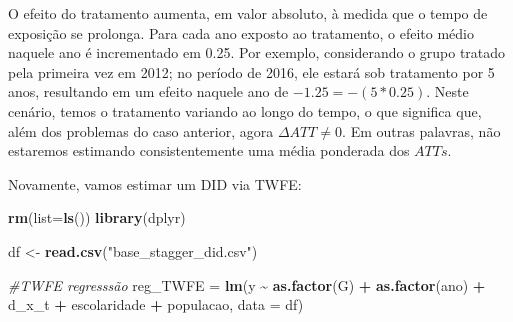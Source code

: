 \documentclass[portugues]{article}
\newenvironment{Shaded}{\begin{snugshade}}{\end{snugshade}}
\newcommand{\AttributeTok}[1]{\textcolor[rgb]{0.13,0.29,0.53}{#1}}
\newcommand{\CommentTok}[1]{\textcolor[rgb]{0.56,0.35,0.01}{\textit{#1}}}
\newcommand{\FunctionTok}[1]{\textcolor[rgb]{0.13,0.29,0.53}{\textbf{#1}}}
\newcommand{\NormalTok}[1]{#1}
\newcommand{\OtherTok}[1]{\textcolor[rgb]{0.56,0.35,0.01}{#1}}
\newcommand{\SpecialCharTok}[1]{\textcolor[rgb]{0.81,0.36,0.00}{\textbf{#1}}}
\newcommand{\StringTok}[1]{\textcolor[rgb]{0.31,0.60,0.02}{#1}}
\begin{document}
\begin{boxA}
\begin{center}
\end{center}

O efeito do tratamento aumenta, em valor absoluto, à medida que o tempo de exposição se prolonga. Para cada ano exposto ao tratamento, o efeito médio naquele ano é incrementado em 0.25. Por exemplo, considerando o grupo tratado pela primeira vez em 2012; no período de 2016, ele estará sob tratamento por 5 anos, resultando em um efeito naquele ano de $ -1.25 = -(5 * 0.25) $. Neste cenário, temos o tratamento variando ao longo do tempo, o que significa que, além dos problemas do caso anterior, agora $\Delta ATT \neq 0$. Em outras palavras, não estaremos estimando consistentemente uma média ponderada dos $ATTs$.

Novamente, vamos estimar um DID via TWFE:

\begin{Shaded}
\begin{Highlighting}[]
\FunctionTok{rm}\NormalTok{(}\AttributeTok{list=}\FunctionTok{ls}\NormalTok{())}
\FunctionTok{library}\NormalTok{(dplyr)}

\NormalTok{df }\OtherTok{\textless{}{-}} \FunctionTok{read.csv}\NormalTok{(}\StringTok{"base\_stagger\_did.csv"}\NormalTok{)}
\end{Highlighting}
\end{Shaded}

\begin{Shaded}
\begin{Highlighting}[]
\CommentTok{\#TWFE regresssão}
\NormalTok{reg\_TWFE }\OtherTok{=} \FunctionTok{lm}\NormalTok{(y }\SpecialCharTok{\textasciitilde{}} \FunctionTok{as.factor}\NormalTok{(G) }\SpecialCharTok{+} \FunctionTok{as.factor}\NormalTok{(ano) }\SpecialCharTok{+}\NormalTok{ d\_x\_t }\SpecialCharTok{+}
\NormalTok{ escolaridade }\SpecialCharTok{+}\NormalTok{ populacao, }\AttributeTok{data =}\NormalTok{ df)}


\end{Highlighting}
\end{Shaded}
\end{boxA}
\end{document}

